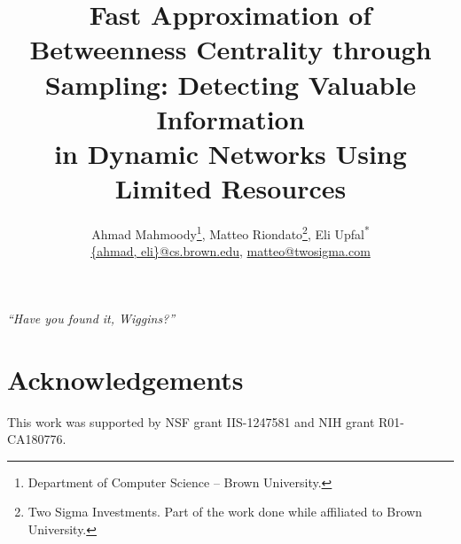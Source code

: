 \documentclass[10pt]{article}
\begin{document}
\title{Fast Approximation of Betweenness Centrality through Sampling}
\author{Ahmad Mahmoody\footnote{Department of Computer Science -- Brown
		University.}, Matteo Riondato\footnote{Two
		Sigma Investments. Part of the work done while affiliated to Brown
	University.}, Eli Upfal\textsuperscript{*}\\
\url{{ahmad, eli}@cs.brown.edu}, \url{matteo@twosigma.com}}

\title{\algonamebasecap: Detecting Valuable Information\\in Dynamic Networks Using Limited Resources}
\maketitle

\textit{``Have you found it, Wiggins?''}
\begin{flushright}
\end{flushright}










\section{Acknowledgements}
This work was supported by NSF grant IIS-1247581 and NIH grant R01-CA180776.



%


% 
\end{document}
